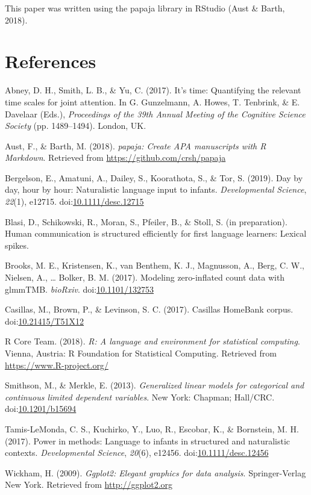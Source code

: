 \documentclass[,man,floatsintext]{apa6}
\begin{document}
This paper was written using the papaja library in RStudio (Aust \&
Barth, 2018).

\newpage

\section{References}\label{refs}

\begingroup
\setlength{\parindent}{-0.5in} \setlength{\leftskip}{0.5in}

\hypertarget{refs}{}
\hypertarget{ref-abney2017time}{}
Abney, D. H., Smith, L. B., \& Yu, C. (2017). It's time: Quantifying the
relevant time scales for joint attention. In G. Gunzelmann, A. Howes, T.
Tenbrink, \& E. Davelaar (Eds.), \emph{Proceedings of the 39th Annual
Meeting of the Cognitive Science Society} (pp. 1489--1494). London, UK.

\hypertarget{ref-R-papaja}{}
Aust, F., \& Barth, M. (2018). \emph{papaja: Create APA manuscripts with
R Markdown}. Retrieved from \url{https://github.com/crsh/papaja}

\hypertarget{ref-bergelson2019day}{}
Bergelson, E., Amatuni, A., Dailey, S., Koorathota, S., \& Tor, S.
(2019). Day by day, hour by hour: Naturalistic language input to
infants. \emph{Developmental Science}, \emph{22}(1), e12715.
doi:\href{https://doi.org/10.1111/desc.12715}{10.1111/desc.12715}

\hypertarget{ref-blasiIPhuman}{}
Blasi, D., Schikowski, R., Moran, S., Pfeiler, B., \& Stoll, S. (in
preparation). Human communication is structured efficiently for first
language learners: Lexical spikes.

\hypertarget{ref-brooks2017modeling}{}
Brooks, M. E., Kristensen, K., van Benthem, K. J., Magnusson, A., Berg,
C. W., Nielsen, A., \ldots{} Bolker, B. M. (2017). Modeling
zero-inflated count data with glmmTMB. \emph{bioRxiv}.
doi:\href{https://doi.org/10.1101/132753}{10.1101/132753}

\hypertarget{ref-Casillas-HB}{}
Casillas, M., Brown, P., \& Levinson, S. C. (2017). Casillas HomeBank
corpus. doi:\href{https://doi.org/10.21415/T51X12}{10.21415/T51X12}

\hypertarget{ref-R-base}{}
R Core Team. (2018). \emph{R: A language and environment for statistical
computing}. Vienna, Austria: R Foundation for Statistical Computing.
Retrieved from \url{https://www.R-project.org/}

\hypertarget{ref-smithson2013generalized}{}
Smithson, M., \& Merkle, E. (2013). \emph{Generalized linear models for
categorical and continuous limited dependent variables}. New York:
Chapman; Hall/CRC.
doi:\href{https://doi.org/10.1201/b15694}{10.1201/b15694}

\hypertarget{ref-tamislemonda2017power}{}
Tamis-LeMonda, C. S., Kuchirko, Y., Luo, R., Escobar, K., \& Bornstein,
M. H. (2017). Power in methods: Language to infants in structured and
naturalistic contexts. \emph{Developmental Science}, \emph{20}(6),
e12456.
doi:\href{https://doi.org/10.1111/desc.12456}{10.1111/desc.12456}

\hypertarget{ref-R-ggplot2}{}
Wickham, H. (2009). \emph{Ggplot2: Elegant graphics for data analysis}.
Springer-Verlag New York. Retrieved from \url{http://ggplot2.org}

\endgroup
\end{document}
